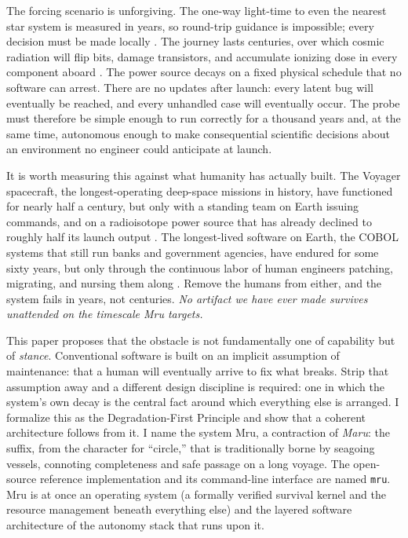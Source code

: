 \documentclass[10pt, a4paper]{article}
\begin{document}
The forcing scenario is unforgiving. The one-way light-time to even the nearest star system is measured in years, so round-trip guidance is impossible; every decision must be made locally \cite{muscettola1998}. The journey lasts centuries, over which cosmic radiation will flip bits, damage transistors, and accumulate ionizing dose in every component aboard \cite{baumann2005, normand1996}. The power source decays on a fixed physical schedule that no software can arrest. There are no updates after launch: every latent bug will eventually be reached, and every unhandled case will eventually occur. The probe must therefore be simple enough to run correctly for a thousand years and, at the same time, autonomous enough to make consequential scientific decisions about an environment no engineer could anticipate at launch.

It is worth measuring this against what humanity has actually built. The Voyager spacecraft, the longest-operating deep-space missions in history, have functioned for nearly half a century, but only with a standing team on Earth issuing commands, and on a radioisotope power source that has already declined to roughly half its launch output \cite{kohlhase1977}. The longest-lived software on Earth, the COBOL systems that still run banks and government agencies, have endured for some sixty years, but only through the continuous labor of human engineers patching, migrating, and nursing them along \cite{gao2016}. Remove the humans from either, and the system fails in years, not centuries. \textit{No artifact we have ever made survives unattended on the timescale Mru targets.}

This paper proposes that the obstacle is not fundamentally one of capability but of \textit{stance}. Conventional software is built on an implicit assumption of maintenance: that a human will eventually arrive to fix what breaks. Strip that assumption away and a different design discipline is required: one in which the system's own decay is the central fact around which everything else is arranged. I formalize this as the Degradation-First Principle and show that a coherent architecture follows from it. I name the system Mru, a contraction of \textit{Maru}: the suffix, from the character for ``circle,'' that is traditionally borne by seagoing vessels, connoting completeness and safe passage on a long voyage. The open-source reference implementation and its command-line interface are named \texttt{mru}. Mru is at once an operating system (a formally verified survival kernel and the resource management beneath everything else) and the layered software architecture of the autonomy stack that runs upon it.
\end{document}
